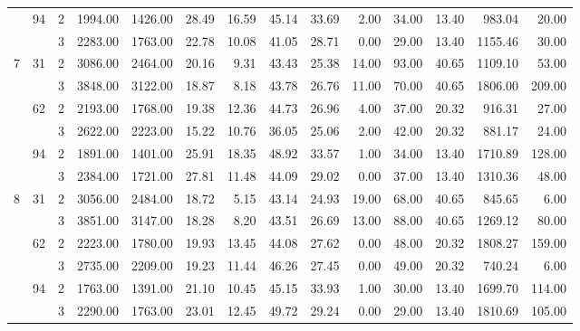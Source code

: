 \begin{tabular}{lllrrrrrrrrrrr}
\cline{2-14}
  & \multirow{2}{*}{94} & 2 &  1994.00 &   1426.00 & 28.49 &   16.59 &   45.14 &   33.69 &    2.00 &   34.00 &   13.40 &  983.04 &    20.00 \\
  &    & 3 &  2283.00 &   1763.00 & 22.78 &   10.08 &   41.05 &   28.71 &    0.00 &   29.00 &   13.40 & 1155.46 &    30.00 \\
\cline{1-14}
\cline{2-14}
\multirow{6}{*}{7} & \multirow{2}{*}{31} & 2 &  3086.00 &   2464.00 & 20.16 &    9.31 &   43.43 &   25.38 &   14.00 &   93.00 &   40.65 & 1109.10 &    53.00 \\
  &    & 3 &  3848.00 &   3122.00 & 18.87 &    8.18 &   43.78 &   26.76 &   11.00 &   70.00 &   40.65 & 1806.00 &   209.00 \\
\cline{2-14}
  & \multirow{2}{*}{62} & 2 &  2193.00 &   1768.00 & 19.38 &   12.36 &   44.73 &   26.96 &    4.00 &   37.00 &   20.32 &  916.31 &    27.00 \\
  &    & 3 &  2622.00 &   2223.00 & 15.22 &   10.76 &   36.05 &   25.06 &    2.00 &   42.00 &   20.32 &  881.17 &    24.00 \\
\cline{2-14}
  & \multirow{2}{*}{94} & 2 &  1891.00 &   1401.00 & 25.91 &   18.35 &   48.92 &   33.57 &    1.00 &   34.00 &   13.40 & 1710.89 &   128.00 \\
  &    & 3 &  2384.00 &   1721.00 & 27.81 &   11.48 &   44.09 &   29.02 &    0.00 &   37.00 &   13.40 & 1310.36 &    48.00 \\
\cline{1-14}
\cline{2-14}
\multirow{6}{*}{8} & \multirow{2}{*}{31} & 2 &  3056.00 &   2484.00 & 18.72 &    5.15 &   43.14 &   24.93 &   19.00 &   68.00 &   40.65 &  845.65 &     6.00 \\
  &    & 3 &  3851.00 &   3147.00 & 18.28 &    8.20 &   43.51 &   26.69 &   13.00 &   88.00 &   40.65 & 1269.12 &    80.00 \\
\cline{2-14}
  & \multirow{2}{*}{62} & 2 &  2223.00 &   1780.00 & 19.93 &   13.45 &   44.08 &   27.62 &    0.00 &   48.00 &   20.32 & 1808.27 &   159.00 \\
  &    & 3 &  2735.00 &   2209.00 & 19.23 &   11.44 &   46.26 &   27.45 &    0.00 &   49.00 &   20.32 &  740.24 &     6.00 \\
\cline{2-14}
  & \multirow{2}{*}{94} & 2 &  1763.00 &   1391.00 & 21.10 &   10.45 &   45.15 &   33.93 &    1.00 &   30.00 &   13.40 & 1699.70 &   114.00 \\
  &    & 3 &  2290.00 &   1763.00 & 23.01 &   12.45 &   49.72 &   29.24 &    0.00 &   29.00 &   13.40 & 1810.69 &   105.00 \\
\cline{1-14}

\end{tabular}
